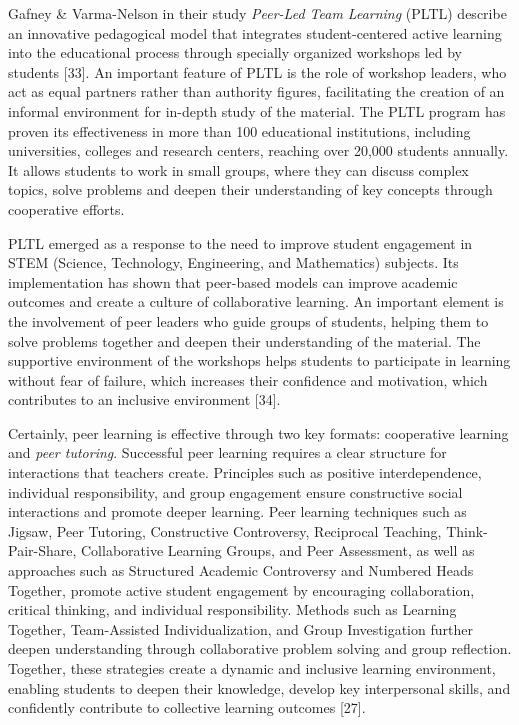 Gafney \& Varma-Nelson in their study \emph{Peer-Led Team Learning}
(PLTL) describe an innovative pedagogical model that integrates
student-centered active learning into the educational process through
specially organized workshops led by students {[}33{]}. An important
feature of PLTL is the role of workshop leaders, who act as equal
partners rather than authority figures, facilitating the creation of an
informal environment for in-depth study of the material. The PLTL
program has proven its effectiveness in more than 100 educational
institutions, including universities, colleges and research centers,
reaching over 20,000 students annually. It allows students to work in
small groups, where they can discuss complex topics, solve problems and
deepen their understanding of key concepts through cooperative efforts.

PLTL emerged as a response to the need to improve student engagement in
STEM (Science, Technology, Engineering, and Mathematics) subjects. Its
implementation has shown that peer-based models can improve academic
outcomes and create a culture of collaborative learning. An important
element is the involvement of peer leaders who guide groups of students,
helping them to solve problems together and deepen their understanding
of the material. The supportive environment of the workshops helps
students to participate in learning without fear of failure, which
increases their confidence and motivation, which contributes to an
inclusive environment {[}34{]}.

Certainly, peer learning is effective through two key formats:
cooperative learning and \emph{peer tutoring}. Successful peer learning
requires a clear structure for interactions that teachers create.
Principles such as positive interdependence, individual responsibility,
and group engagement ensure constructive social interactions and promote
deeper learning. Peer learning techniques such as Jigsaw, Peer Tutoring,
Constructive Controversy, Reciprocal Teaching, Think-Pair-Share,
Collaborative Learning Groups, and Peer Assessment, as well as
approaches such as Structured Academic Controversy and Numbered Heads
Together, promote active student engagement by encouraging
collaboration, critical thinking, and individual responsibility. Methods
such as Learning Together, Team-Assisted Individualization, and Group
Investigation further deepen understanding through collaborative problem
solving and group reflection. Together, these strategies create a
dynamic and inclusive learning environment, enabling students to deepen
their knowledge, develop key interpersonal skills, and confidently
contribute to collective learning outcomes {[}27{]}.

